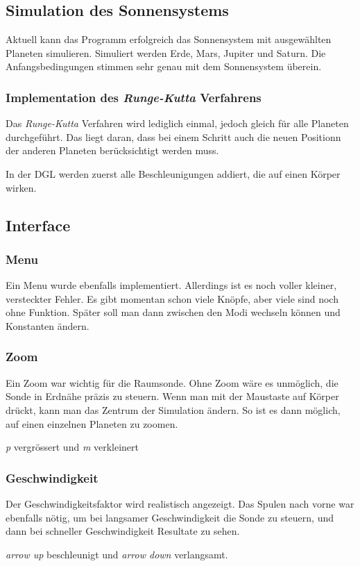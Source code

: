 \documentclass{article}
\begin{document}
\subsection{Simulation des Sonnensystems}
Aktuell kann das Programm erfolgreich das Sonnensystem mit ausgewählten Planeten simulieren. Simuliert werden Erde, Mars, Jupiter und Saturn. Die Anfangsbedingungen stimmen sehr genau mit dem Sonnensystem überein.
\subsubsection{Implementation des \textit{Runge-Kutta }Verfahrens}
Das \textit{Runge-Kutta} Verfahren wird lediglich einmal, jedoch gleich für alle Planeten durchgeführt. Das liegt daran, dass bei einem Schritt auch die neuen Positionn der anderen Planeten berücksichtigt werden muss.

In der DGL werden zuerst alle Beschleunigungen addiert, die auf einen Körper wirken.
\subsection{Interface}
\subsubsection{Menu}
Ein Menu wurde ebenfalls implementiert. Allerdings ist es noch voller kleiner, versteckter Fehler. Es gibt momentan schon viele Knöpfe, aber viele sind noch ohne Funktion. Später soll man dann zwischen den Modi wechseln können und Konstanten ändern.
\subsubsection{Zoom}
Ein Zoom war wichtig für die Raumsonde. Ohne Zoom wäre es unmöglich, die Sonde in Erdnähe präzis zu steuern. Wenn man mit der Maustaste auf Körper drückt, kann man das Zentrum der Simulation ändern. So ist es dann möglich, auf einen einzelnen Planeten zu zoomen.

\textit{p} vergrössert und \textit{m} verkleinert
\subsubsection{Geschwindigkeit}
Der Geschwindigkeitsfaktor wird realistisch angezeigt. Das Spulen nach vorne war ebenfalls nötig, um bei langsamer Geschwindigkeit die Sonde zu steuern, und dann bei schneller Geschwindigkeit Resultate zu sehen.

\textit{arrow up} beschleunigt und \textit{arrow down} verlangsamt.
\end{document}
